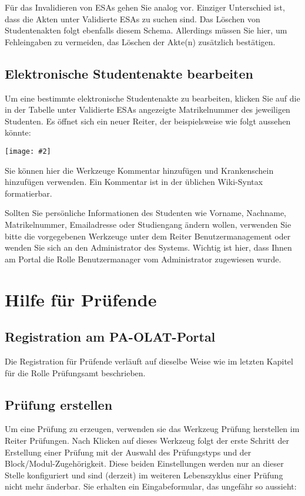 \documentclass[a4paper,11pt]{article}
\newcommand{\bild}[2]{
    \begin{center}\texttt{[image: \#2]}\end{center}
}
\newcommand{\knopf}[1]{{\sc #1}}
\begin{document}
Für das Invalidieren von ESAs gehen Sie analog vor. Einziger Unterschied ist,
dass die Akten unter \knopf{Validierte ESAs} zu suchen sind.  Das Löschen von
Studentenakten folgt ebenfalls diesem Schema. Allerdings müssen Sie hier, um
Fehleingaben zu vermeiden, das Löschen der Akte(n) zusätzlich bestätigen.

\subsection{Elektronische Studentenakte bearbeiten}

Um eine bestimmte elektronische Studentenakte zu bearbeiten, klicken Sie auf
die in der Tabelle unter \knopf{Validierte ESAs} angezeigte Matrikelnummer des
jeweiligen Studenten. Es öffnet sich ein neuer Reiter, der beispielsweise wie
folgt aussehen könnte:

\bild{.9}{ESA-Edit}

Sie können hier die Werkzeuge \knopf{Kommentar hinzufügen} und
\knopf{Krankenschein hinzufügen} verwenden. Ein Kommentar ist in der üblichen
Wiki-Syntax formatierbar.

Sollten Sie persönliche Informationen des Studenten wie Vorname, Nachname,
Matrikelnummer, Emailadresse oder Studiengang ändern wollen, verwenden Sie
bitte die vorgegebenen Werkzeuge unter dem Reiter \knopf{Benutzermanagement}
oder wenden Sie sich an den Administrator des Systems. Wichtig ist hier, dass
Ihnen am Portal die Rolle Benutzermanager vom Administrator zugewiesen wurde.

\clearpage
\section{Hilfe für Prüfende}

\subsection{Registration am PA-OLAT-Portal}

Die Registration für Prüfende verläuft auf dieselbe Weise wie im letzten
Kapitel für die Rolle Prüfungsamt beschrieben.

\subsection{Prüfung erstellen}

Um eine Prüfung zu erzeugen, verwenden sie das Werkzeug \knopf{Prüfung
  herstellen} im Reiter \knopf{Prüfungen}. Nach Klicken auf dieses Werkzeug
folgt der erste Schritt der Erstellung einer Prüfung mit der Auswahl des
Prüfungstyps und der Block/Modul-Zugehörigkeit. Diese beiden Einstellungen
werden nur an dieser Stelle konfiguriert und sind (derzeit) im weiteren
Lebenszyklus einer Prüfung nicht mehr änderbar. Sie erhalten ein
Eingabeformular, das ungefähr so aussieht:
\end{document}
